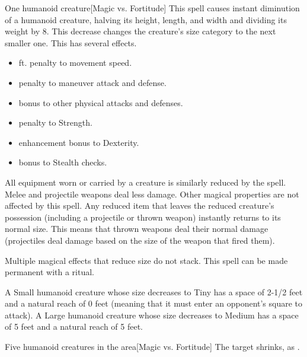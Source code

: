 \spellrng{\rngclose}
\spelldur{\durshort \dismissable}
\begin{spelltarget}{One humanoid creature}[Magic vs. Fortitude]
    \spellsuccess This spell causes instant diminution of a humanoid creature, halving its height, length, and width and dividing its weight by 8. This decrease changes the creature's size category to the next smaller one. This has several effects.
    \begin{itemize} 
        \item {} ft. penalty to movement speed.
        \item {} penalty to maneuver attack and defense.
        \item {} bonus to other physical attacks and defenses.
        \item {} penalty to Strength.
        \item {} enhancement bonus to Dexterity.
        \item {} bonus to Stealth checks.
    \end{itemize}
    \par All equipment worn or carried by a creature is similarly reduced by the spell. Melee and projectile weapons deal less damage. Other magical properties are not affected by this spell. Any reduced item that leaves the reduced creature's possession (including a projectile or thrown weapon) instantly returns to its normal size. This means that thrown weapons deal their normal damage (projectiles deal damage based on the size of the weapon that fired them).
\end{spelltarget}
\spellnotes Multiple magical effects that reduce size do not stack. This spell can be made permanent with a  ritual.
\par A Small humanoid creature whose size decreases to Tiny has a space of 2-1/2 feet and a natural reach of 0 feet (meaning that it must enter an opponent's square to attack). A Large humanoid creature whose size decreases to Medium has a space of 5 feet and a natural reach of 5 feet.

\spelldur{\durshort \dismissable}
\begin{spelltargets}{Five humanoid creatures in the area}[Magic vs. Fortitude]
    \spellsuccess The target shrinks, as .
\end{spelltargets}

